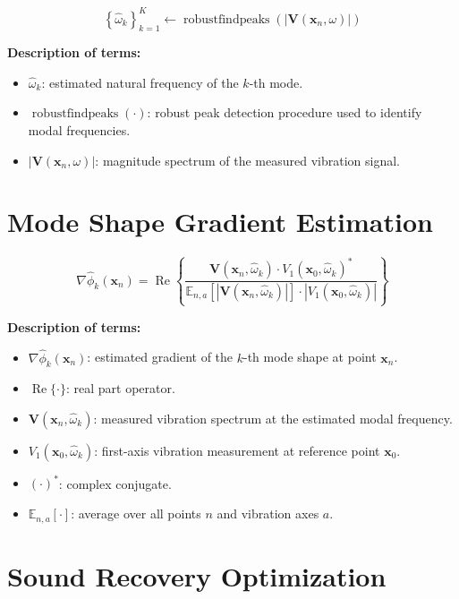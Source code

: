 \documentclass[11pt]{article}
\begin{document}
\begin{equation}
\left\{
\hat{\omega}_k
\right\}_{k=1}^{K}
\leftarrow
\operatorname{robustfindpeaks}
\left(
\left|
\bm{V}(\bm{x}_n,\omega)
\right|
\right)
\end{equation}

\textbf{Description of terms:}

\begin{itemize}
    \item $\hat{\omega}_k$: estimated natural frequency of the $k$-th mode.
    \item $\operatorname{robustfindpeaks}(\cdot)$: robust peak detection procedure used to identify modal frequencies.
    \item $|\bm{V}(\bm{x}_n,\omega)|$: magnitude spectrum of the measured vibration signal.
\end{itemize}

\section{Mode Shape Gradient Estimation}

\begin{equation}
\nabla \hat{\phi}_k(\bm{x}_n)
=
\operatorname{Re}
\left\{
\frac{
\bm{V}(\bm{x}_n,\hat{\omega}_k)
\cdot
V_1(\bm{x}_0,\hat{\omega}_k)^*
}{
\mathbb{E}_{n,a}
\left[
\left|
\bm{V}(\bm{x}_n,\hat{\omega}_k)
\right|
\right]
\cdot
\left|
V_1(\bm{x}_0,\hat{\omega}_k)
\right|
}
\right\}
\end{equation}

\textbf{Description of terms:}

\begin{itemize}
    \item $\nabla \hat{\phi}_k(\bm{x}_n)$: estimated gradient of the $k$-th mode shape at point $\bm{x}_n$.
    \item $\operatorname{Re}\{\cdot\}$: real part operator.
    \item $\bm{V}(\bm{x}_n,\hat{\omega}_k)$: measured vibration spectrum at the estimated modal frequency.
    \item $V_1(\bm{x}_0,\hat{\omega}_k)$: first-axis vibration measurement at reference point $\bm{x}_0$.
    \item $(\cdot)^*$: complex conjugate.
    \item $\mathbb{E}_{n,a}[\cdot]$: average over all points $n$ and vibration axes $a$.
\end{itemize}

\section{Sound Recovery Optimization}
\end{document}
